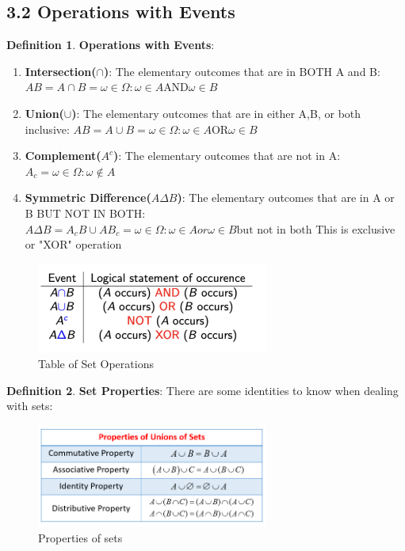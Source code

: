 \documentclass[12pt]{amsart}
\theoremstyle{definition}
\newtheorem{definition}{Definition} %
\numberwithin{equation}{theorem}    %
\begin{document}
\subsection*{3.2 Operations with Events}

\begin{definition}
    \textbf{Operations with Events}:
    \begin{enumerate}
        \item \textbf{Intersection($\cap$)}:
            The elementary outcomes that are in BOTH A and B: $AB = A \cap B={\omega \in \Omega  :\omega \in A \text{AND} \omega \in B}$
        \item \textbf{Union($\cup$)}:
            The elementary outcomes that are in either A,B, or both inclusive: $AB = A \cup B={\omega \in \Omega  :\omega \in A \text{OR} \omega \in B}$
        \item \textbf{Complement($A^c$)}:
            The elementary outcomes that are not in A: $A_c = {\omega \in \Omega : \omega \notin A}$
        \item \textbf{Symmetric Difference($A\Delta B$)}:
            The elementary outcomes that are in A or B BUT NOT IN BOTH: $A\Delta B = A_c B \cup AB_c = {\omega \in \Omega : \omega \in A or \omega \in B \text{but not in both}}$ This is exclusive or "XOR" operation
    \end{enumerate} 
\end{definition}

\begin{figure}[H]
    \centering
    \includegraphics[width=3in]{Media/optable.png}
    \caption{Table of Set Operations}
    \label{optable}
\end{figure}

\begin{definition}
    \textbf{Set Properties}:
    There are some identities to know when dealing with sets:
    \begin{figure}[H]
        \centering
        \includegraphics[width=3in]{Media/setproperties.png}
        \caption{Properties of sets}
        \label{setproperties}
    \end{figure}
\end{definition}
\end{document}
